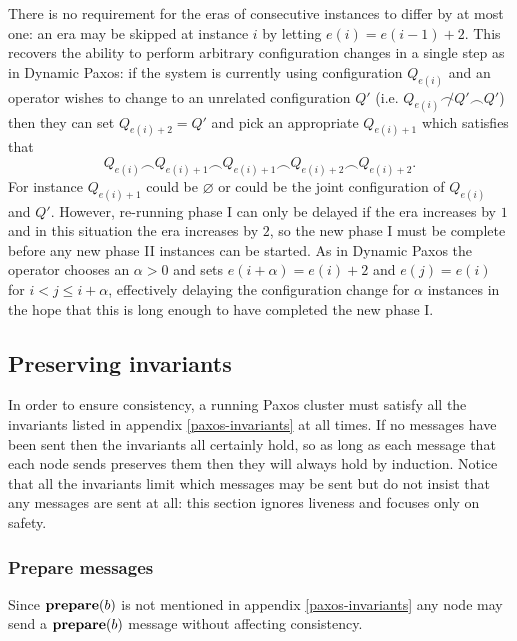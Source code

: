 \documentclass[journal]{IEEEtran}
\begin{document}
There is no requirement for the eras of consecutive instances to differ by at
most one: an era may be skipped at instance $i$ by letting $e(i) = e(i-1) + 2$.
This recovers the ability to perform arbitrary configuration changes in a
single step as in Dynamic Paxos: if the system is currently using configuration
$Q_{e(i)}$ and an operator wishes to change to an unrelated configuration $Q'$
(i.e.  $Q_{e(i)} \not\frown Q' \frown Q'$) then they can set $Q_{e(i)+2} = Q'$
and pick an appropriate $Q_{e(i)+1}$ which satisfies that \[Q_{e(i)} \frown
Q_{e(i) + 1} \frown Q_{e(i)+1} \frown Q_{e(i) + 2} \frown Q_{e(i) + 2}.\] For
instance $Q_{e(i)+1}$ could be $\varnothing$ or could be the joint
configuration of $Q_{e(i)}$ and $Q'$.  However, re-running phase I can only be
delayed if the era increases by $1$ and in this situation the era increases by
$2$, so the new phase I must be complete before any new phase II instances can
be started.  As in Dynamic Paxos the operator chooses an $\alpha > 0$ and sets
$e(i+\alpha) = e(i)+2$ and $e(j) = e(i)$ for $i < j \le i + \alpha$,
effectively delaying the configuration change for $\alpha$ instances in the
hope that this is long enough to have completed the new phase I.

\subsection{Preserving invariants}

In order to ensure consistency, a running Paxos cluster must satisfy all the
invariants listed in appendix \ref{paxos-invariants} at all times. If no
messages have been sent then the invariants all certainly hold, so as long as
each message that each node sends preserves them then they will always hold by
induction. Notice that all the invariants limit which messages may be sent but
do not insist that any messages are sent at all: this section ignores liveness
and focuses only on safety.

\subsubsection{Prepare messages} Since $\mathbf{prepare}(b)$ is not mentioned in appendix
\ref{paxos-invariants} any node may send a $\mathbf{prepare}(b)$ message without affecting
consistency.
\end{document}
